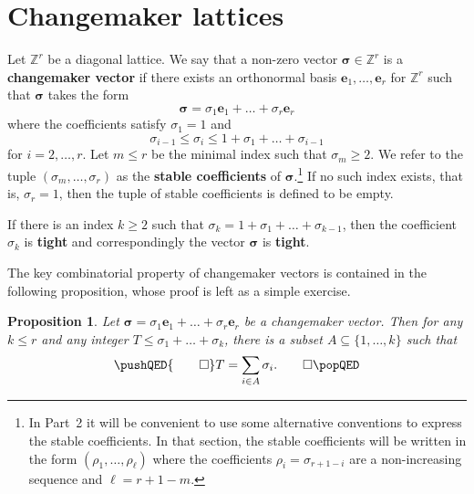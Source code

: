 \documentclass{amsart} %
\newcommand{\Z}{\mathbb{Z}}
\newcommand{\e}{\bm{e}}
\newcommand{\bsigma}{\bm{\sigma}}
\theoremstyle{thm}
\newtheorem{prop}[Theorem]{Proposition}
\theoremstyle{definition}
\numberwithin{equation}{section}
\begin{document}
\section{Changemaker lattices}\label{sec:changemaker}
Let $\Z^r$ be a diagonal lattice. We say that a non-zero vector $\bsigma\in \Z^r$ is a \textbf{changemaker vector} if there exists an orthonormal basis $\e_1, \dots, \e_r$ for $\Z^r$ such that $\bsigma$ takes the form
\[
\bsigma = \sigma_1 \e_1 + \dots + \sigma_r \e_r
\]
where the coefficients satisfy $\sigma_1=1$ and
\[\sigma_{i-1}\leq \sigma_i\leq 1+ \sigma_1 + \dots + \sigma_{i-1}\]
for $i=2, \dots, r$. Let $m\leq r$ be the minimal index such that $\sigma_m\geq 2$. We refer to the tuple $(\sigma_m, \dots, \sigma_r)$ as the \textbf{stable coefficients} of $\bsigma$.\footnote{In Part~2 it will be convenient to use some alternative conventions to express the stable coefficients. In that section, the stable coefficients will be written in the form $(\rho_1, \dots, \rho_\ell)$ where the coefficients $\rho_i = \sigma_{r+1-i}$ are a non-increasing sequence and $\ell = r+1-m$.} If no such index exists, that is, $\sigma_r=1$, then the tuple of stable coefficients is defined to be empty.

If there is an index $k\geq 2$ such that $\sigma_k=1+\sigma_1+\dots + \sigma_{k-1}$, then the coefficient $\sigma_k$ is \textbf{tight} and correspondingly the vector $\bsigma$ is \textbf{tight}.

The key combinatorial property of changemaker vectors is contained in the following proposition, whose proof is left as a simple exercise.
\begin{prop}\label{prop:CM_condition}
Let $\bsigma = \sigma_1 \e_1 + \dots + \sigma_r \e_r$ be a changemaker vector.
Then for any $k\leq r$ and any integer $T\leq \sigma_1 + \dots + \sigma_k$, there is a subset $A\subseteq \{1,\dots, k\}$ such that 
\[
\pushQED{\qed} 
T=\sum_{i\in A}\sigma_i.\qedhere
\popQED
\]
\end{prop}
\end{document}
